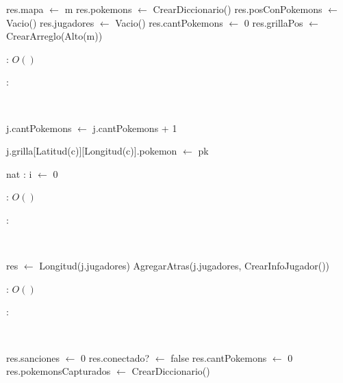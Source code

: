 \begin{Algoritmos}

	\begin{algorithm}[H]
		\NoCaptionOfAlgo
		\caption{}
		res.mapa $\leftarrow$ m\;
		res.pokemons $\leftarrow$ CrearDiccionario()\;
		res.posConPokemons $\leftarrow$ Vacio()\;
		res.jugadores $\leftarrow$ Vacio()\;
		res.cantPokemons $\leftarrow$ 0\;
		res.grillaPos $\leftarrow$ CrearArreglo(Alto(m))\;
	\end{algorithm}

	\complejidad: $O()$

	\justifcomp:

	~

	\begin{algorithm}[H]
		\NoCaptionOfAlgo
		\caption{}
		j.cantPokemons $\leftarrow$ j.cantPokemons + 1\;

		j.grilla[Latitud(c)][Longitud(c)].pokemon $\leftarrow$ pk\;

		nat : i $\leftarrow$ 0\;
	\end{algorithm}

	\complejidad: $O()$

	\justifcomp:

	~

	\begin{algorithm}[H]
		\NoCaptionOfAlgo
		\caption{}
		res $\leftarrow$ Longitud(j.jugadores)\; 
		AgregarAtras(j.jugadores, CrearInfoJugador())\;
	\end{algorithm}

	\complejidad: $O()$

	\justifcomp:

	~

	\begin{algorithm}[H]
		\NoCaptionOfAlgo
		\caption{}
		res.sanciones $\leftarrow$ 0\;
		res.conectado? $\leftarrow$ false\;
		res.cantPokemons $\leftarrow$ 0\;
		res.pokemonsCapturados $\leftarrow$ CrearDiccionario()\;
	\end{algorithm}


\end{Algoritmos}
